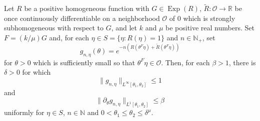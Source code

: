 \documentclass[smallextended]{svjour3}
\theoremstyle{remark}
\newcommand\Exp{\operatorname{Exp}}
\begin{document}
\begin{lemma}\label{lem:AmplitudeSobolevEstimates}
Let $R$ be a positive homogeneous function with $G\in\Exp(R)$, $\widetilde{R}:\mathcal{O}\to\mathbb{R}$ be once continuously differentiable on a neighborhood $\mathcal{O}$ of $0$ which is strongly subhomogeneous with respect to $G$, and let $k$ and $\mu$ be positive real numbers. Set $F=(k/\mu) G$ and, for each $\eta\in S=\{\eta:R(\eta)=1\}$ and $n\in\mathbb{N}_+$, set
\begin{equation*}
    g_{n,\eta}(\theta)=e^{-n\left(R\left(\theta^F\eta\right)+\widetilde{R}\left(\theta^F\eta\right)\right)}
\end{equation*}
for $\theta>0$ which is sufficiently small so that $\theta^F\eta\in\mathcal{O}$. Then, for each $\beta>1$, there is $\delta>0$ for which 
\begin{equation*}
    \|g_{n,\eta}\|_{L^\infty[\theta_1,\theta_2]}\leq 1
\end{equation*}
and
\begin{equation*}
    \|\partial_\theta g_{n,\eta}\|_{L^1[\theta_1,\theta_2]}\leq \beta
\end{equation*}
uniformly for $\eta\in S$, $n\in\mathbb{N}$ and $0<\theta_1\leq\theta_2\leq \delta^{\mu}$.
\end{lemma}
\end{document}
